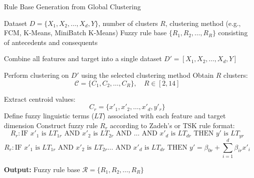 \documentclass[12pt]{report}
\begin{document}
\begin{algorithm}[H]
\caption{Rule Base Generation from Global Clustering}
\label{alg:rule_generation}
\begin{algorithmic}[1]
\Require Dataset $D = \{ X_1, X_2, \ldots, X_d, Y \}$, number of clusters $R$, clustering method (e.g., FCM, K-Means, MiniBatch K-Means)
\Ensure Fuzzy rule base $\{ R_1, R_2, \ldots, R_R \}$ consisting of antecedents and consequents

\State Combine all features and target into a single dataset $D' = [X_1, X_2, \ldots, X_d, Y]$

\State Perform clustering on $D'$ using the selected clustering method
\State Obtain $R$ clusters:
\[
\mathcal{C} = \{ C_1, C_2, \ldots, C_R \}, \quad R \in [2,14]
\]

    \State Extract centroid values:
    \[
    C_r = \{ x'_1, x'_2, \ldots, x'_d, y'_r \}
    \]
    \State Define fuzzy linguistic terms ($LT$) associated with each feature and target dimension
    \State Construct fuzzy rule $R_r$ according to Zadeh’s or TSK rule format:
    \[
    R_r: \text{IF } x'_1 \text{ is } LT_{1r} \text{ AND } x'_2 \text{ is } LT_{2r} \text{ AND } \ldots \text{ AND } x'_d \text{ is } LT_{dr} \text{ THEN } y' \text{ is } LT_{yr}
    \]
    \[
    R_r : \text{IF } x'_1 \text{ is } LT_{1r} \text{ AND } x'_2 \text{ is } LT_{2r} \ldots \text{ AND } x'_d \text{ is } LT_{dr}
    \text{ THEN } y' = \beta_{0r} + \sum_{i=1}^{d} \beta_{ir} x'_i
    \]
\EndFor

\Statex
\State \textbf{Output:} Fuzzy rule base $\mathcal{R} = \{ R_1, R_2, \ldots, R_R \}$
\end{algorithmic}
\end{algorithm}
\end{document}
